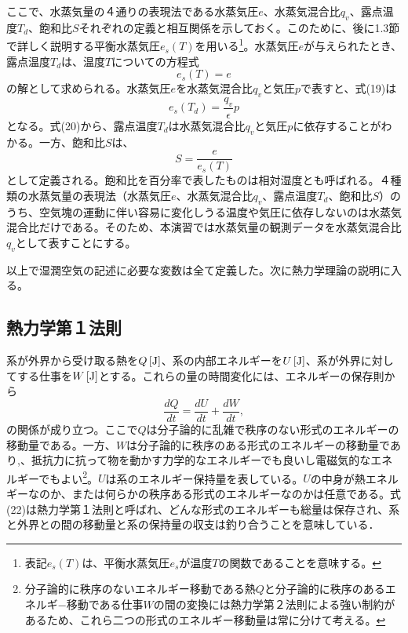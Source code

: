 \documentclass{jsarticle}
\begin{document}
ここで、水蒸気量の４通りの表現法である水蒸気圧$e$、水蒸気混合比$q_{v}$、露点温度$T_{d}$、飽和比$S$それぞれの定義と相互関係を示しておく。このために、後に1.3節で詳しく説明する平衡水蒸気圧$e_{s}(T)$を用いる\footnote{表記$e_{s}(T)$は、平衡水蒸気圧$e_{s}$が温度$T$の関数であることを意味する。}。水蒸気圧$e$が与えられたとき、露点温度$T_{d}$は、温度$T$についての方程式
\begin{equation}
 e_{s}(T)=e
\end{equation}
の解として求められる。水蒸気圧$e$を水蒸気混合比$q_{v}$と気圧$p$で表すと、式(19)は
\begin{equation}
 e_{s}(T_{d})=\frac{q_{v}}{\epsilon}p
\end{equation}
となる。式(20)から、露点温度$T_{d}$は水蒸気混合比$q_{v}$と気圧$p$に依存することがわかる。一方、飽和比$S$は、
\begin{equation}
 S=\frac{e}{e_{s}(T)}
\end{equation}
として定義される。飽和比を百分率で表したものは相対湿度とも呼ばれる。４種類の水蒸気量の表現法（水蒸気圧$e$、水蒸気混合比$q_{v}$、露点温度$T_{d}$、飽和比$S$）のうち、空気塊の運動に伴い容易に変化しうる温度や気圧に依存しないのは水蒸気混合比だけである。そのため、本演習では水蒸気量の観測データを水蒸気混合比$q_{v}$として表すことにする。

以上で湿潤空気の記述に必要な変数は全て定義した。次に熱力学理論の説明に入る。

\subsection{熱力学第１法則}
系が外界から受け取る熱を$Q\,[\rm{J}]$、系の内部エネルギーを$U\,[\rm{J}]$、系が外界に対してする仕事を$W\,[\rm{J}]$とする。これらの量の時間変化には、エネルギーの保存則から
\begin{equation}
 \frac{dQ}{dt}=\frac{dU}{dt}+\frac{dW}{dt},
\end{equation}
の関係が成り立つ。ここで$Q$は分子論的に乱雑で秩序のない形式のエネルギーの移動量である。一方、$W$は分子論的に秩序のある形式のエネルギーの移動量であり,、抵抗力に抗って物を動かす力学的なエネルギーでも良いし電磁気的なエネルギーでもよい\footnote{分子論的に秩序のないエネルギー移動である熱$Q$と分子論的に秩序のあるエネルギ−移動である仕事$W$の間の変換には熱力学第２法則による強い制約があるため、これら二つの形式のエネルギー移動量は常に分けて考える。}。$U$は系のエネルギー保持量を表している。$U$の中身が熱エネルギーなのか、または何らかの秩序ある形式のエネルギーなのかは任意である。式(22)は熱力学第１法則と呼ばれ、どんな形式のエネルギーも総量は保存され、系と外界との間の移動量と系の保持量の収支は釣り合うことを意味している．
\end{document}
